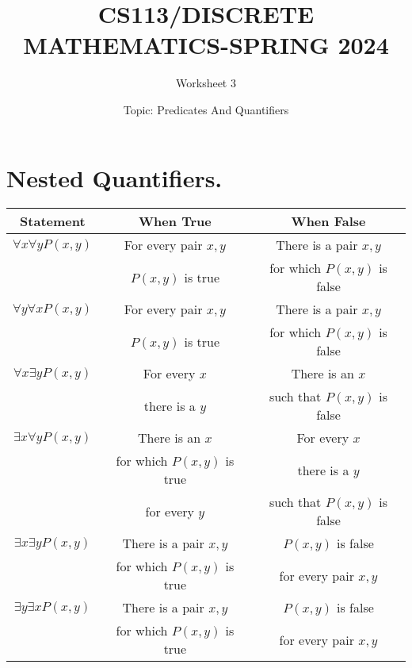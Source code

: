 \documentclass{exam}
\title{CS113/DISCRETE MATHEMATICS-SPRING 2024}
\author{Worksheet 3}
\date{Topic: Predicates And Quantifiers}
\begin{document}
\maketitle

\begin{center}
\end{center}

\vspace{5mm}

\vspace{5mm}

\section{Nested Quantifiers. }
\vspace{5mm}
\begin{center}
\begin{tabular}{|c|c|c|}
\hline
Statement & When True & When False \\
\hline
$\forall x \forall y P(x, y)$ & For every pair $x, y$ & There is a pair $x, y$ \\
& $P(x, y)$ is true & for which $P(x, y)$ is false \\
\hline
$\forall y \forall x P(x, y)$ & For every pair $x, y$ & There is a pair $x, y$ \\
& $P(x, y)$ is true & for which $P(x, y)$ is false \\
\hline
$\forall x \exists y P(x, y)$ & For every $x$ & There is an $x$ \\
& there is a $y$ & such that $P(x, y)$ is false \\
\hline
$\exists x \forall y P(x, y)$ & There is an $x$ & For every $x$ \\
& for which $P(x, y)$ is true & there is a $y$ \\
& for every $y$ & such that $P(x, y)$ is false \\
\hline
$\exists x \exists y P(x, y)$ & There is a pair $x, y$ & $P(x, y)$ is false \\
& for which $P(x, y)$ is true & for every pair $x, y$ \\
\hline
$\exists y \exists x P(x, y)$ & There is a pair $x, y$ & $P(x, y)$ is false \\
& for which $P(x, y)$ is true & for every pair $x, y$ \\
\hline
\end{tabular}

\end{center}
\vspace{5mm}
\end{document}
